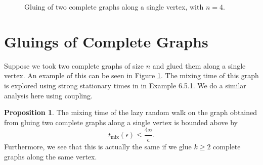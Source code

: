 \documentclass[10pt,a4paper]{amsart}
\theoremstyle{definition}
\numberwithin{definition}{section}
\newtheorem{proposition}[definition]{Proposition}
\begin{document}
\begin{figure}
    \begin{center}
\end{center}
\caption{Gluing of two complete graphs along a single vertex, with $n=4$.}
\label{fig:graph3}
\end{figure}

\section{Gluings of Complete Graphs} \label{sec:three}

Suppose we took two complete graphs of size $n$ and glued them along a single vertex. An example of this can be seen in Figure \ref{fig:graph3}. The mixing time of this graph is explored using strong stationary times in \cite{LevinPeresWilmer2006} in Example 6.5.1. We do a similar analysis here using coupling.

\begin{proposition}\label{prop:gluedcopies}
The mixing time of the lazy random walk on the graph obtained from gluing two complete graphs along a single vertex is bounded above by 
\[ t_{\text{mix}}(\epsilon) \leq \frac{4n}{\epsilon}.\]
Furthermore, we see that this is actually the same if we glue $k \geq 2$ complete graphs along the same vertex.
\end{proposition}
\end{document}
